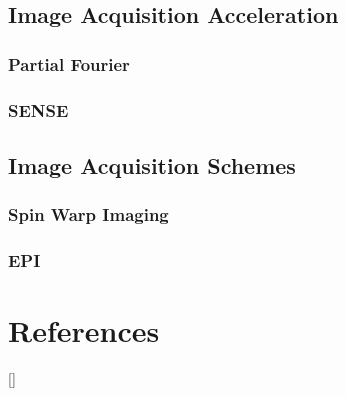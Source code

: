 \subsection{Image Acquisition Acceleration}

\subsubsection{Partial Fourier}

\subsubsection{\ac*{SENSE}}


\subsection{Image Acquisition Schemes}

\subsubsection{Spin Warp Imaging}

\subsubsection{\ac*{EPI}}

\newpage
\section{References}
[\refname]{}
\printbibliography